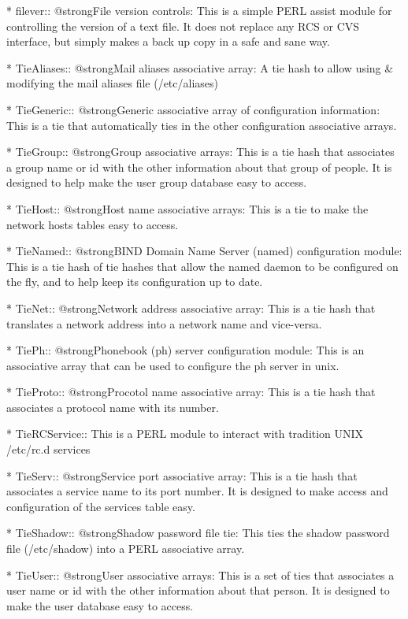 * filever::	@strong{File version controls:} This is a simple PERL assist module for controlling the version of a text file.  It does not replace any RCS or CVS interface, but simply makes a back up copy in a safe and sane way. 

* TieAliases::	@strong{Mail aliases associative array:} A tie hash to allow using & modifying the mail aliases file (/etc/aliases) 

* TieGeneric::	@strong{Generic associative array of configuration information:}  This is a tie that automatically ties in the other configuration associative arrays. 

* TieGroup::	@strong{Group associative arrays:} This is a tie hash that associates a group name or id with the other information about that group of people.  It is designed to help make the user group database easy to access. 

* TieHost::	@strong{Host name associative arrays:} This is a tie to make the network hosts tables easy to access. 

* TieNamed::	@strong{BIND Domain Name Server (named) configuration module:} This is a tie hash of tie hashes that allow the named daemon to be configured on the fly, and to help keep its configuration up to date. 

* TieNet::	@strong{Network address associative array:} This is a tie hash that translates a network address into a network name and vice-versa. 

* TiePh::	@strong{Phonebook (ph) server configuration module:} This is an associative array that can be used to configure the ph server in unix. 

* TieProto::	@strong{Procotol name associative array:} This is a tie hash that associates a protocol name with its number. 

* TieRCService::	This is a PERL module to interact with tradition UNIX /etc/rc.d services 

* TieServ::	@strong{Service port associative array:} This is a tie hash that associates a service name to its port number.  It is designed to make access and configuration of the services table easy. 

* TieShadow::	@strong{Shadow password file tie:}  This ties the shadow password file (/etc/shadow) into a PERL associative array. 

* TieUser::	@strong{User associative arrays:} This is a set of ties that associates a user name or id with the other information about that person.  It is designed to make the user database easy to access. 


